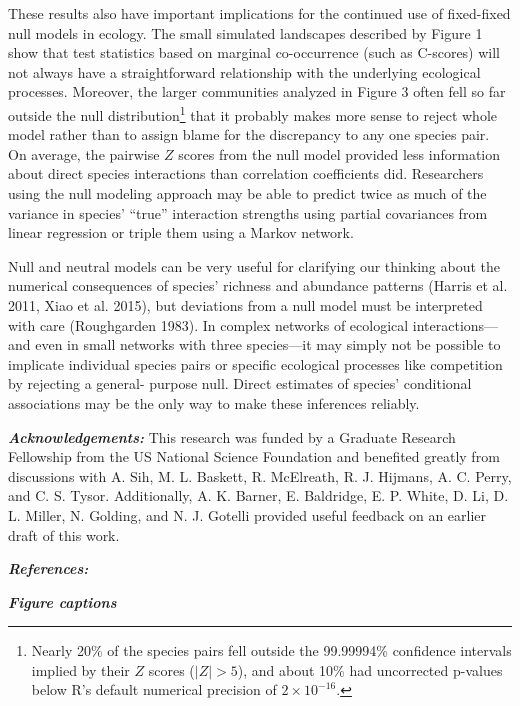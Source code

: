 \documentclass[12pt,]{article}
\begin{document}
\begin{spacing}{1.9}
\begin{flushleft}
These results also have important implications for the continued use of
fixed-fixed null models in ecology. The small simulated landscapes
described by Figure 1 show that test statistics based on marginal
co-occurrence (such as C-scores) will not always have a straightforward
relationship with the underlying ecological processes. Moreover, the
larger communities analyzed in Figure 3 often fell so far outside the
null distribution\footnote{Nearly 20\% of the species pairs fell outside
  the 99.99994\% confidence intervals implied by their \(Z\) scores
  (\(|Z| > 5\)), and about 10\% had uncorrected p-values below R's
  default numerical precision of \(2 \times 10^{-16}\).} that it
probably makes more sense to reject whole model rather than to assign
blame for the discrepancy to any one species pair. On average, the
pairwise \(Z\) scores from the null model provided less information
about direct species interactions than correlation coefficients did.
Researchers using the null modeling approach may be able to predict
twice as much of the variance in species' ``true'' interaction strengths
using partial covariances from linear regression or triple them using a
Markov network.

Null and neutral models can be very useful for clarifying our thinking
about the numerical consequences of species' richness and abundance
patterns (Harris et al. 2011, Xiao et al. 2015), but deviations from a
null model must be interpreted with care (Roughgarden 1983). In complex
networks of ecological interactions---and even in small networks with
three species---it may simply not be possible to implicate individual
species pairs or specific ecological processes like competition by
rejecting a general- purpose null. Direct estimates of species'
conditional associations may be the only way to make these inferences
reliably.

\textbf{\emph{Acknowledgements:}} This research was funded by a Graduate
Research Fellowship from the US National Science Foundation and
benefited greatly from discussions with A. Sih, M. L. Baskett, R.
McElreath, R. J. Hijmans, A. C. Perry, and C. S. Tysor. Additionally, A.
K. Barner, E. Baldridge, E. P. White, D. Li, D. L. Miller, N. Golding,
and N. J. Gotelli provided useful feedback on an earlier draft of this
work.

\textbf{\emph{References:}}

\textbf{\emph{Figure captions}}


\end{flushleft}
\end{spacing}
\end{document}
